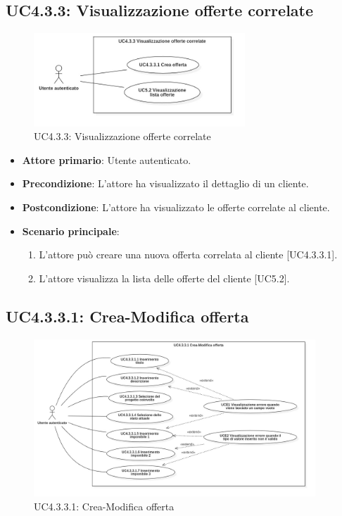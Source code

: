 \subsection{UC4.3.3: Visualizzazione offerte correlate}
\begin{figure}[!h]
\centering
\includegraphics[width=300px]{../images/UC/.jpeg/UC4.3.3.0-visualizzazioneOfferteCorrelate.jpg}
\caption{UC4.3.3: Visualizzazione offerte correlate}
\end{figure}

\begin{itemize}
\item \textbf{Attore primario}: Utente autenticato.
\item \textbf{Precondizione}: L'attore ha visualizzato il dettaglio di un cliente.
\item \textbf{Postcondizione}: L'attore ha visualizzato le offerte correlate al cliente.
\item \textbf{Scenario principale}:
\begin{enumerate}
\item L'attore può creare una nuova offerta correlata al cliente [UC4.3.3.1].
\item L'attore visualizza la lista delle offerte del cliente [UC5.2].
\end{enumerate}
\end{itemize}

\pagebreak

\subsection{UC4.3.3.1: Crea-Modifica offerta}
\begin{figure}[!h]
\centering
\includegraphics[width=400px]{../images/UC/.jpeg/UC4.3.3.1-nuovaModificaOfferta.jpg}
\caption{UC4.3.3.1: Crea-Modifica offerta}
\end{figure}

